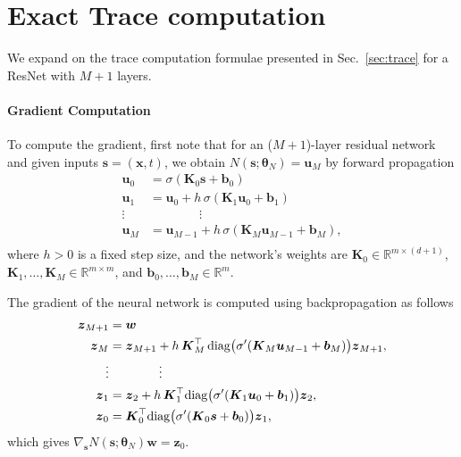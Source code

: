 \documentclass[letterpaper]{article}
\newcommand{\bfth}{\boldsymbol{\theta}}
\newcommand{\bfb}{\boldsymbol{b}}
\newcommand{\bfs}{\boldsymbol{s}}
\newcommand{\bfu}{\boldsymbol{u}}
\newcommand{\bfw}{\boldsymbol{w}}
\newcommand{\bfx}{\boldsymbol{x}}
\newcommand{\bfz}{\boldsymbol{z}}
\newcommand{\bfK}{\boldsymbol{K}}
\newcommand{\R}{\ensuremath{\mathds{R}}}
\begin{document}
\section{Exact Trace computation} 
\label{app:trace}
	
	We expand on the trace computation formulae presented in Sec.~\ref{sec:trace} for a ResNet with $M+1$ layers.
	
	\paragraph{Gradient Computation}
	To compute the gradient, first note that for an ($M+1$)-layer residual network and given inputs $\bfs = (\bfx,t)$, we obtain $N(\bfs; \bfth_N) = \bfu_M$ by forward propagation 
	\begin{equation}
	    \begin{split}
	    \bfu_0 & = \sigma(\bfK_0 \bfs + \bfb_0) \\ 
	    \bfu_1 & = \bfu_0 + h \, \sigma(\bfK_1 \bfu_0 + \bfb_1)\\
	    \vdots & \qquad\qquad\vdots\\  
	    \bfu_M &= \bfu_{M-1} + h \, \sigma(\bfK_M \bfu_{M-1} + \bfb_M),\\  
	    \end{split}
	\end{equation}
	where $h>0$ is a fixed step size, and the network's weights are $\bfK_0 \in \R^{m \times (d+1)}$, $\bfK_1,\ldots, \bfK_M \in \R^{m\times m}$, and $\bfb_0, \ldots, \bfb_M \in \R^m$.
	

	The gradient of the neural network is computed using backpropagation as follows
	\begin{equation} \label{eq:app_backprop}
	\begin{split}
	 	\bfz_{M+1} &= \bfw \\
	    \bfz_M     &= \bfz_{M+1} + h \, \bfK_M^\top \, {\rm diag}\big(\sigma'(\bfK_M \bfu_{M-1} + \bfb_M)\big) \bfz_{M+1},\\  
	    \vdots & \qquad \qquad\vdots\\
	    \bfz_{1} &= \bfz_2 + h \, \bfK_{1}^\top {\rm diag}\big(\sigma'(\bfK_{1} \bfu_{0} + \bfb_{1})\big) \bfz_2,\\  
	    \bfz_{0} &= \bfK_{0}^\top {\rm diag}\big(\sigma'(\bfK_{0} \bfs + \bfb_{0})\big) \bfz_1,\\  
 	\end{split}
	\end{equation}
	which gives $\nabla_{\bfs} N(\bfs;\bfth_N) \bfw = \bfz_0$.
\end{document}
